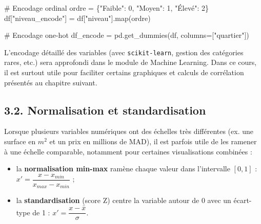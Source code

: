 \documentclass[
  french,
  letterpaper,
  open=any]{scrbook}
\newenvironment{Shaded}{\begin{snugshade}}{\end{snugshade}}
\newcommand{\BuiltInTok}[1]{\textcolor[rgb]{0.00,0.23,0.31}{#1}}
\newcommand{\CommentTok}[1]{\textcolor[rgb]{0.37,0.37,0.37}{#1}}
\newcommand{\DecValTok}[1]{\textcolor[rgb]{0.68,0.00,0.00}{#1}}
\newcommand{\NormalTok}[1]{\textcolor[rgb]{0.00,0.23,0.31}{#1}}
\newcommand{\OperatorTok}[1]{\textcolor[rgb]{0.37,0.37,0.37}{#1}}
\newcommand{\StringTok}[1]{\textcolor[rgb]{0.13,0.47,0.30}{#1}}
\providecommand{\tightlist}{%
  \setlength{\itemsep}{0pt}\setlength{\parskip}{0pt}}
\theoremstyle{definition}
\theoremstyle{definition}
\theoremstyle{remark}
\begin{document}
\begin{Shaded}
\begin{Highlighting}[]
\CommentTok{\# Encodage ordinal}
\NormalTok{ordre }\OperatorTok{=}\NormalTok{ \{}\StringTok{"Faible"}\NormalTok{: }\DecValTok{0}\NormalTok{, }\StringTok{"Moyen"}\NormalTok{: }\DecValTok{1}\NormalTok{, }\StringTok{"Élevé"}\NormalTok{: }\DecValTok{2}\NormalTok{\}}
\NormalTok{df[}\StringTok{"niveau\_encode"}\NormalTok{] }\OperatorTok{=}\NormalTok{ df[}\StringTok{"niveau"}\NormalTok{].}\BuiltInTok{map}\NormalTok{(ordre)}

\CommentTok{\# Encodage one{-}hot}
\NormalTok{df\_encode }\OperatorTok{=}\NormalTok{ pd.get\_dummies(df, columns}\OperatorTok{=}\NormalTok{[}\StringTok{"quartier"}\NormalTok{])}
\end{Highlighting}
\end{Shaded}

\begin{tcolorbox}[enhanced jigsaw, arc=.35mm, bottomrule=.15mm, bottomtitle=1mm, breakable, colback=white, colbacktitle=quarto-callout-note-color!10!white, colframe=quarto-callout-note-color-frame, coltitle=black, left=2mm, leftrule=.75mm, opacityback=0, opacitybacktitle=0.6, rightrule=.15mm, title=\textcolor{quarto-callout-note-color}{\faInfo}\hspace{0.5em}{Note}, titlerule=0mm, toprule=.15mm, toptitle=1mm]

L'encodage détaillé des variables (avec \texttt{scikit-learn}, gestion
des catégories rares, etc.) sera approfondi dans le module de Machine
Learning. Dans ce cours, il est surtout utile pour faciliter certains
graphiques et calculs de corrélation présentés au chapitre suivant.

\end{tcolorbox}

\subsection{3.2. Normalisation et
standardisation}\label{normalisation-et-standardisation}

Lorsque plusieurs variables numériques ont des échelles très différentes
(ex. une surface en \(m^2\) et un prix en millions de MAD), il est
parfois utile de les ramener à une échelle comparable, notamment pour
certaines visualisations combinées :

\begin{itemize}
\tightlist
\item
  la \textbf{normalisation min-max} ramène chaque valeur dans
  l'intervalle \([0, 1]\) :
  \(x' = \dfrac{x - x_{min}}{x_{max} - x_{min}}\) ;
\item
  la \textbf{standardisation} (score Z) centre la variable autour de 0
  avec un écart-type de 1 : \(x' = \dfrac{x - \bar{x}}{\sigma}\).
\end{itemize}
\end{document}

